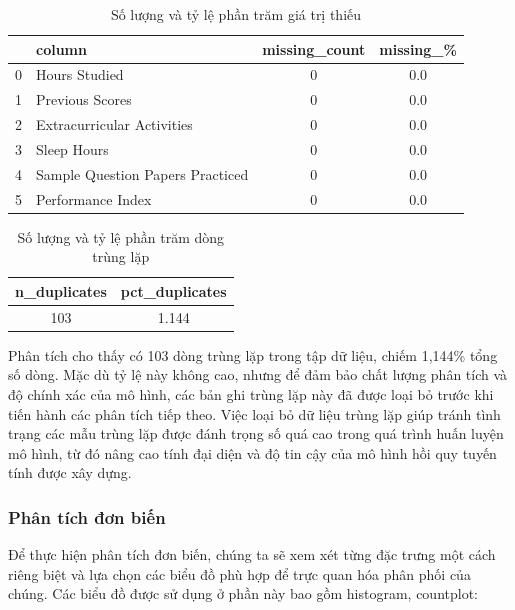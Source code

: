 \begin{table}[H]
	\centering
	\begin{tabular}{|c|l|c|c|}
		\hline
		\textbf{} & \textbf{column}                  & \textbf{missing\_count} & \textbf{missing\_\%} \\ \hline
		0         & Hours Studied                    & 0                       & 0.0                  \\
		1         & Previous Scores                  & 0                       & 0.0                  \\
		2         & Extracurricular Activities       & 0                       & 0.0                  \\
		3         & Sleep Hours                      & 0                       & 0.0                  \\
		4         & Sample Question Papers Practiced & 0                       & 0.0                  \\
		5         & Performance Index                & 0                       & 0.0                  \\ \hline
	\end{tabular}
	\caption{Số lượng và tỷ lệ phần trăm giá trị thiếu}
\end{table}

\begin{table}[H]
	\centering
	\begin{tabular}{|c|c|}
		\hline
		\textbf{n\_duplicates} & \textbf{pct\_duplicates} \\ \hline
		103                    & 1.144                    \\ \hline
	\end{tabular}
	\caption{Số lượng và tỷ lệ phần trăm dòng trùng lặp}
\end{table}

Phân tích cho thấy có 103 dòng trùng lặp trong tập dữ liệu, chiếm 1,144\% tổng số dòng. Mặc dù tỷ lệ này không cao, nhưng để đảm bảo chất lượng phân tích và độ chính xác của mô hình, các bản ghi trùng lặp này đã được loại bỏ trước khi tiến hành các phân tích tiếp theo. Việc loại bỏ dữ liệu trùng lặp giúp tránh tình trạng các mẫu trùng lặp được đánh trọng số quá cao trong quá trình huấn luyện mô hình, từ đó nâng cao tính đại diện và độ tin cậy của mô hình hồi quy tuyến tính được xây dựng.

\subsubsection{Phân tích đơn biến}
Để thực hiện phân tích đơn biến, chúng ta sẽ xem xét từng đặc trưng một cách riêng biệt và lựa chọn các biểu đồ phù hợp để trực quan hóa phân phối của chúng. Các biểu đồ được sử dụng ở phần này bao gồm histogram, countplot:

